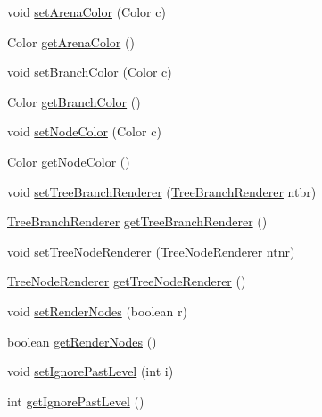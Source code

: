 \begin{DoxyCompactItemize}
\item 
void \hyperlink{classorg_1_1jgap_1_1util_1_1tree_1_1_tree_visualizer_a2a4f3fe2e835d8175abf1aa574c4d551}{set\-Arena\-Color} (Color c)
\item 
Color \hyperlink{classorg_1_1jgap_1_1util_1_1tree_1_1_tree_visualizer_ab0a86603d10e6317832a47dd3fb20db9}{get\-Arena\-Color} ()
\item 
void \hyperlink{classorg_1_1jgap_1_1util_1_1tree_1_1_tree_visualizer_acad8c3da2ed3ca67a81adc39f5c947ab}{set\-Branch\-Color} (Color c)
\item 
Color \hyperlink{classorg_1_1jgap_1_1util_1_1tree_1_1_tree_visualizer_a0fcb4a4315c4b7a7a19107a2a20209bc}{get\-Branch\-Color} ()
\item 
void \hyperlink{classorg_1_1jgap_1_1util_1_1tree_1_1_tree_visualizer_a20c846913b4555502f4136fc8420e391}{set\-Node\-Color} (Color c)
\item 
Color \hyperlink{classorg_1_1jgap_1_1util_1_1tree_1_1_tree_visualizer_a43b1de1d40b04dc68b8fe1beb790fbde}{get\-Node\-Color} ()
\item 
void \hyperlink{classorg_1_1jgap_1_1util_1_1tree_1_1_tree_visualizer_a3c6c6104f70f2d0fbbc2a60d9a6a2c34}{set\-Tree\-Branch\-Renderer} (\hyperlink{interfaceorg_1_1jgap_1_1util_1_1tree_1_1_tree_branch_renderer}{Tree\-Branch\-Renderer} ntbr)
\item 
\hyperlink{interfaceorg_1_1jgap_1_1util_1_1tree_1_1_tree_branch_renderer}{Tree\-Branch\-Renderer} \hyperlink{classorg_1_1jgap_1_1util_1_1tree_1_1_tree_visualizer_a3a39aef0c4d11324d49be1dfa79f60ed}{get\-Tree\-Branch\-Renderer} ()
\item 
void \hyperlink{classorg_1_1jgap_1_1util_1_1tree_1_1_tree_visualizer_ade9dd05bfb619bda61d0b02e3eed96ca}{set\-Tree\-Node\-Renderer} (\hyperlink{interfaceorg_1_1jgap_1_1util_1_1tree_1_1_tree_node_renderer}{Tree\-Node\-Renderer} ntnr)
\item 
\hyperlink{interfaceorg_1_1jgap_1_1util_1_1tree_1_1_tree_node_renderer}{Tree\-Node\-Renderer} \hyperlink{classorg_1_1jgap_1_1util_1_1tree_1_1_tree_visualizer_a633132af4d13e9ae7187f1cd24f55567}{get\-Tree\-Node\-Renderer} ()
\item 
void \hyperlink{classorg_1_1jgap_1_1util_1_1tree_1_1_tree_visualizer_a475be747ea3cea1fc891ece932d008fb}{set\-Render\-Nodes} (boolean r)
\item 
boolean \hyperlink{classorg_1_1jgap_1_1util_1_1tree_1_1_tree_visualizer_ac8e79bc7cdf432a5b6b14b87fe232296}{get\-Render\-Nodes} ()
\item 
void \hyperlink{classorg_1_1jgap_1_1util_1_1tree_1_1_tree_visualizer_a41ad6f577a571244079b7ac71548e7ed}{set\-Ignore\-Past\-Level} (int i)
\item 
int \hyperlink{classorg_1_1jgap_1_1util_1_1tree_1_1_tree_visualizer_ac1443ca8cc570497ae27543eeeb0e59f}{get\-Ignore\-Past\-Level} ()
\end{DoxyCompactItemize}
